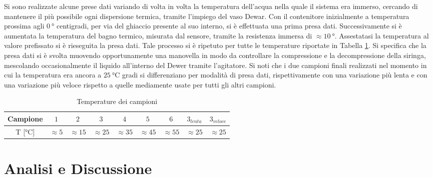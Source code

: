 \documentclass[a4paper,11pt,oneside]{article}
\begin{document}
Si sono realizzate alcune prese dati variando di volta in volta la temperatura dell'acqua nella quale il sistema era immerso, cercando di mantenere il più possibile ogni dispersione termica, tramite l'impiego del vaso Dewar. Con il contenitore inizialmente a temperatura prossima agli $\SI{0}{\degree}$ centigradi, per via del ghiaccio presente al suo interno, si è effettuata una prima presa dati. Successivamente si è aumentata la temperatura del bagno termico, misurata dal sensore, tramite la resistenza immersa di $\approx\SI{10}{\degree}$. Assestatasi la temperatura al valore prefissato si è rieseguita la presa dati. Tale processo si è ripetuto per tutte le temperature riportate in Tabella \ref{tab:camp_temp}. Si specifica che la presa dati si è svolta muovendo opportunamente una manovella in modo da controllare la compressione e la decompressione della siringa, mescolando occasionalmente il liquido all'interno del Dewer tramite l'agitatore. Si noti che i due campioni finali realizzati nel momento in cui la temperatura era ancora a $\SI{25}{\celsius}$ gradi si differenziano per modalità di presa dati, rispettivamente con una variazione più lenta e con una variazione più veloce rispetto a quelle mediamente usate per tutti gli altri campioni.

\begin{table}[h!]
    \centering
    \begin{tabular}{|c|c|c|c|c|c|c|c|c|}
        \hline
        Campione & $1$ & $2$ & $3$ & $4$ & $5$ & $6$ & $3_{lenta}$ & $3_{veloce}$\\\hline
        \rowcolor[rgb]{0.85,0.85,0.85} T [$\si{\celsius}$] & $\approx5$ & $\approx15$ & $\approx25$ & $\approx35$ & $\approx45$ & $\approx55$ & $\approx25$ & $\approx25$ \\\hline
    \end{tabular}
    \caption{Temperature dei campioni}
    \label{tab:camp_temp}
\end{table}

\section{Analisi e Discussione}
\end{document}
